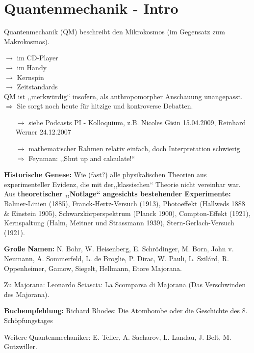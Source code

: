 \renewcommand{\thechapter}{\Roman{chapter}}  %

\chapter{Quantenmechanik - Intro}

Quantenmechanik (QM) beschreibt den Mikrokosmos (im Gegensatz zum Makrokosmos).

\noindent
$ \rightarrow $ im CD-Player\\
$ \rightarrow $ im Handy\\
$ \rightarrow $ Kernspin\\
$ \rightarrow $ Zeitstandards\\

\noindent
QM ist ,,merkwürdig`` insofern, als anthropomorpher Anschauung unangepasst. $ \Rightarrow $ Sie sorgt noch heute für hitzige und kontroverse Debatten.

\begin{itemize}
	\item[$ \rightarrow $] siehe Podcasts PI - Kolloquium, z.B. Nicoles Gisin 15.04.2009, Reinhard Werner 24.12.2007
	\item[$ \rightarrow $] mathematischer Rahmen relativ einfach, doch Interpretation schwierig\\
	$ \Rightarrow $ Feynman: ,,Shut up and calculate{!}``
\end{itemize}
\textbf{Historische Genese:} Wie (fast?) alle physikalischen Theorien aus experimenteller Evidenz, die mit der,,klassischen`` Theorie nicht vereinbar war.\\[5pt]
Aus \textbf{theoretischer ,,Notlage`` angesichts bestehender Experimente:}\\
Balmer-Linien (1885), Franck-Hertz-Versuch (1913), Photoeffekt (Hallweds 1888 \& Einstein 1905), Schwarzkörperspektrum (Planck 1900), Compton-Effekt (1921), Kernspaltung (Halm, Meitner und Strassmann 1939), Stern-Gerlach-Versuch (1921).\par
\textbf{Große Namen:} N. Bohr, W. Heisenberg, E. Schrödinger, M. Born, John v. Neumann, A. Sommerfeld, L. de Broglie, P. Dirac, W. Pauli, L. Szil\'ard, R. Oppenheimer, Gamow, Siegelt, Hellmann, Etore Majorana.\par
Zu Majorana: Leonardo Sciascia: La Scomparsa di Majorana (Das Verschwinden des Majorana).\par
\textbf{Buchempfehlung:} Richard Rhodes: Die Atombombe oder die Geschichte des 8. Schöpfungstages\par
Weitere Quantenmechaniker: E. Teller, A. Sacharov, L. Landau, J. Belt, M. Gutzwiller.\\[10pt]

